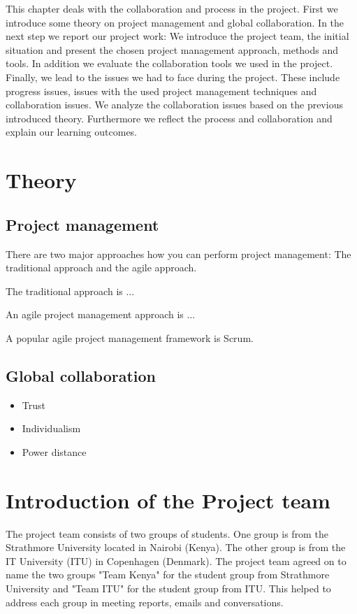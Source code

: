 This chapter deals with the collaboration and process in the project. First we introduce some theory on project management and global collaboration. In the next step we report our project work: We introduce the project team, the initial situation and present the chosen project management approach, methods and tools. In addition we evaluate the collaboration tools we used in the project. Finally, we lead to the issues we had to face during the project. These include progress issues, issues with the used project management techniques and collaboration issues. We analyze the collaboration issues based on the previous introduced theory. Furthermore we reflect the process and collaboration and explain our learning outcomes.


\section{Theory}

\subsection{Project management}

There are two major approaches how you can perform project management: The traditional approach and the agile approach.

The traditional approach is ... 

An agile project management approach is ... 

A popular agile project management framework is Scrum. 

\subsection{Global collaboration} 

	\begin{itemize}
		\item Trust
		\item Individualism
		\item Power distance
	\end{itemize}


\section{Introduction of the Project team}

The project team consists of two groups of students. One group is from the Strathmore University located in Nairobi (Kenya). The other group is from the IT University (ITU) in Copenhagen (Denmark). The project team agreed on to name the two groups "Team Kenya" for the student group from Strathmore University and "Team ITU" for the student group from ITU. This helped to address each group in meeting reports, emails and conversations.

